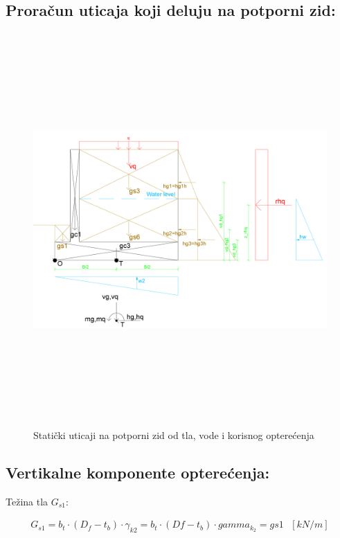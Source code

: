 \documentclass[a4paper, 11pt]{article}
\begin{document}
\subsection*{Prora\v{c}un uticaja koji deluju na potporni zid:}

\begin{figure}[h]
    \centering
    \includegraphics[width=\textwidth, height=15cm]{../Graphics/RetainingWall1_gravity.png}
    \caption{Stati\v{c}ki uticaji na potporni zid od tla, vode i korisnog optere\'cenja}
    \label{uticaji_zida}
\end{figure}


\newpage

\subsection*{Vertikalne komponente optere\'cenja:}


Te\v{z}ina tla $G_{s1}$:

\begin{align*}
G_{s1} = b_{t} \cdot (D_{f} - t_{b}) \cdot \gamma_{k2} = b_t \cdot (Df - t_b) \cdot gamma_k_2 = gs1 \text{ } [kN/m]
\end{align*}
\end{document}
